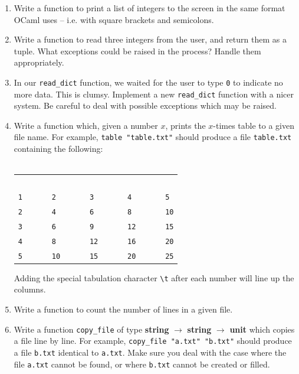 \documentclass[]{book}
\newcommand\upquote[1]{\textquotesingle#1\textquotesingle}
\begin{document}
\begin{enumerate}
\item Write a function to print a list of integers to the screen in the same format OCaml uses -- i.e. with square brackets and semicolons. 
\item Write a function to read three integers from the user, and return them as a tuple. What exceptions could be raised in the process? Handle them appropriately.
\item In our \texttt{read\_dict} function, we waited for the user to type \texttt{0} to indicate no more data. This is clumsy. Implement a new \texttt{read\_dict} function with a nicer system. Be careful to deal with possible exceptions which may be raised.
\item Write a function which, given a number $x$, prints the $x$-times table to a given file name. For example, \texttt{table\! "table.txt"} should produce a file \texttt{table.txt} containing the following:\\\\


\vspace{1mm}
\begin{tabular}{lllll}
 \verb! ! & \verb!      ! & \verb!      ! & \verb!      ! & \verb!      !\\
 \verb!1! & \verb!     2! & \verb!     3! & \verb!     4! & \verb!     5!\\
 \verb!2! & \verb!     4! & \verb!     6! & \verb!     8! & \verb!     10!\\
 \verb!3! & \verb!     6! & \verb!     9! & \verb!     12! & \verb!     15!\\
 \verb!4! & \verb!     8! & \verb!     12! & \verb!     16! & \verb!     20!\\
 \verb!5! & \verb!     10! & \verb!     15! & \verb!     20! & \verb!     25!
\end{tabular}
\vspace{1mm}

\noindent Adding the special tabulation character \texttt{\upquote{\textbackslash t}} after each number will line up the columns.
\item Write a function to count the number of lines in a given file.
\item Write a function \texttt{copy\_file} of type \textrm{\textbf{string} $\rightarrow$ \textbf{string} $\rightarrow$ \textbf{unit}} which copies a file line by line. For example, \texttt{copy\_file\! "a.txt"\! "b.txt"} should produce a file \texttt{b.txt} identical to \texttt{a.txt}. Make sure you deal with the case where the file \texttt{a.txt} cannot be found, or where \texttt{b.txt} cannot be created or filled. 
\end{enumerate}
\end{document}
